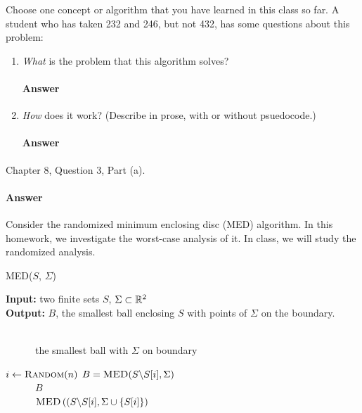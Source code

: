 \documentclass{article}
\begin{document}
\collab{\todo{}}

Choose one concept or algorithm that you have learned
in this class so far. A student who has
taken 232 and 246, but not 432, has some questions about this problem:

\begin{enumerate}
    \item \emph{What} is the problem that this algorithm solves?

        \paragraph{Answer}
        \todo{}

    \item \emph{How} does it work? (Describe in prose, with or without
        psuedocode.)

        \paragraph{Answer}
        \todo{}

\end{enumerate}


\collab{\todo{}}

Chapter 8, Question 3, Part (a).

\paragraph{Answer}

Consider the randomized minimum enclosing disc (MED) algorithm.  In this
homework, we investigate the worst-case analysis of it.  In class, we will study
the randomized analysis.

\begin{algorithm}\caption{\textsc{MED($S$, $\Sigma$)}}\label{alg:seb}
    {\bf Input:} two finite sets $S$, $\Sigma \subset {\mathbb R}^2$\\
    {\bf Output:} $B$, the smallest ball enclosing $S$ with points of
    $\Sigma$ on the boundary.

    \begin{algorithmic}[1]
        \\
        ~~~~~~\Return the smallest ball with $\Sigma$ on boundary
        \EndIf

        \State $i \gets \textsc{Random}(n)$
        \State $B = \textsc{MED}(S \backslash S[i], \Sigma)$
        \\
        ~~~~~~\Return $B$
        \Else\\
        ~~~~~~\Return $\textsc{MED}\left((S \backslash S[i], \Sigma \cup \{ S[i]
        \}\right)$
        \EndIf
    \end{algorithmic}
\end{algorithm}
\end{document}
